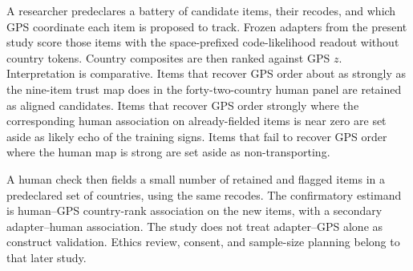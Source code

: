 A researcher predeclares a battery of candidate items, their recodes, and which GPS coordinate each item is proposed to track. Frozen adapters from the present study score those items with the space-prefixed code-likelihood readout without country tokens. Country composites are then ranked against GPS $z$. Interpretation is comparative. Items that recover GPS order about as strongly as the nine-item trust map does in the forty-two-country human panel are retained as aligned candidates. Items that recover GPS order strongly where the corresponding human association on already-fielded items is near zero are set aside as likely echo of the training signs. Items that fail to recover GPS order where the human map is strong are set aside as non-transporting.

A human check then fields a small number of retained and flagged items in a predeclared set of countries, using the same recodes. The confirmatory estimand is human--GPS country-rank association on the new items, with a secondary adapter--human association. The study does not treat adapter--GPS alone as construct validation. Ethics review, consent, and sample-size planning belong to that later study.
